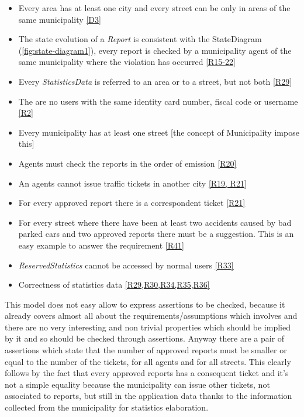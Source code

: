 \documentclass[a4paper]{report}
\begin{document}
\begin{itemize}
\item Every area has at least one city and every street can be only in areas of the same municipality \hyperref[D3]{[D3]}
\item The state evolution of a \textit{Report} is consistent with the StateDiagram (\ref{fig:state-diagram1}), every report is checked by a municipality agent of the same municipality where the violation has occurred \hyperref[R15]{[R15-22]}
\item Every \textit{StatisticsData} is referred to an area or to a street, but not both \hyperref[R29]{[R29]}
\item The are no users with the same identity card number, fiscal code or username \hyperref[R2]{[R2]}
\item Every municipality has at least one street [the concept of Municipality impose this]
\item Agents must check the reports in the order of emission \hyperref[R20]{[R20]}
\item An agents cannot issue traffic tickets in another city \hyperref[R19]{[R19, R21]}
\item For every approved report there is a correspondent ticket \hyperref[R21]{[R21]}
\item For every street where there have been at least two accidents caused by bad parked cars and two approved reports there must be a suggestion. This is an easy example to answer the requirement \hyperref[R41]{[R41]}
\item \textit{ReservedStatistics} cannot be accessed by normal users \hyperref[R33]{[R33]}
\item Correctness of statistics data \hyperref[R29]{[R29,R30,R34,R35,R36]}
\end{itemize}
This model does not easy allow to express assertions to be checked, because it already covers almost all about the requirements/assumptions which involves and there are no very interesting and non trivial properties which should be implied by it and so should be checked through assertions. Anyway there are a pair of assertions which state that the number of approved reports must be smaller or equal to the number of the tickets, for all agents and for all streets. This clearly follows by the fact that every approved reports has a consequent ticket and it's not a simple equality because the municipality can issue other tickets, not associated to reports, but still in the application data thanks to the information collected from the municipality for statistics elaboration.\\
\end{document}
